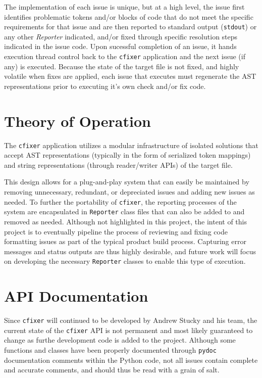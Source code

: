 \documentclass[11pt]{scrreprt}
\begin{document}
The implementation of each issue is unique, but at a high level, the issue first identifies problematic tokens and/or blocks of code that do not meet the specific requirements for that issue and are then reported to standard output (\texttt{stdout}) or any other \textit{Reporter} indicated, and/or fixed through specific resolution steps indicated in the issue code.
Upon sucessful completion of an issue, it hands execution thread control back to the \texttt{cfixer} application and the next issue (if any) is executed.
Because the state of the target file is not fixed, and highly volatile when fixes are applied, each issue that executes must regenerate the AST representations prior to executing it's own check and/or fix code.

\section{Theory of Operation}

The \texttt{cfixer} application utilizes a modular infrastructure of isolated solutions that accept AST representations (typically in the form of serialized token mappings) and string representations (through reader/writer APIs) of the target file.

This design allows for a plug-and-play system that can easily be maintained by removing unnecessary, redundant, or depreciated issues and adding new issues as needed.
To further the portability of \texttt{cfixer}, the reporting processes of the system are encapsulated in \texttt{Reporter} class files that can also be added to and removed as needed.
Although not highlighted in this project, the intent of this project is to eventually pipeline the process of reviewing and fixing code formatting issues as part of the typical product build process.
Capturing error messages and status outputs are thus highly desirable, and future work will focus on developing the necessary \texttt{Reporter} classes to enable this type of execution.

\section{API Documentation}
Since \texttt{cfixer} will continued to be developed by Andrew Stucky and his team, the current state of the \texttt{cfixer} API is not permanent and most likely guaranteed to change as furthe development code is added to the project.
Although some functions and classes have been properly documented through \texttt{pydoc} documentation comments within the Python code, not all issues contain complete and accurate comments, and should thus be read with a grain of salt.
\end{document}
